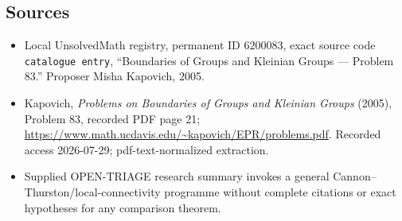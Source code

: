 \documentclass[11pt]{article}
\begin{document}
\subsection{Sources}
\begin{itemize}
\item Local UnsolvedMath registry, permanent ID \(6200083\), exact source code \texttt{catalogue entry}, ``Boundaries of Groups and Kleinian Groups --- Problem 83.'' Proposer Misha Kapovich, 2005.
\item Kapovich, \emph{Problems on Boundaries of Groups and Kleinian Groups} (2005), Problem 83, recorded PDF page 21; \url{https://www.math.ucdavis.edu/~kapovich/EPR/problems.pdf}. Recorded access 2026-07-29; pdf-text-normalized extraction.
\item Supplied OPEN-TRIAGE research summary invokes a general Cannon--Thurston/local-connectivity programme without complete citations or exact hypotheses for any comparison theorem.
\end{itemize}
\end{document}
